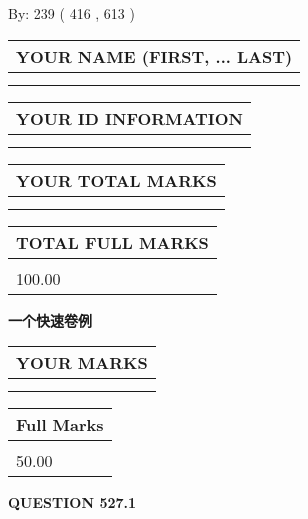 \documentclass{ctexart}
\begin{document}
   
\hspace{1.0in} By: 
 239 ( 416 ,  613 )
   
   
   
   
\newpage 
\setcounter{page}{ 
   527001 } 
   
   
   
   
\noindent\begin{tabular}{|l|}
\hline
YOUR NAME (FIRST, ... LAST)  \\
\hline
 \\ 
 \\ 
\hline
\end{tabular}
\hspace{0.05in} \begin{tabular}{|l|}
\hline
 YOUR   ID   INFORMATION  \\
\hline
 \\ 
 \\ 
\hline
\end{tabular}
   
   
\vspace{0.2in}\noindent\begin{tabular}{|l|}
\hline
YOUR TOTAL MARKS  \\
\hline
 \\ 
 \\ 
\hline
\end{tabular}
\hspace{0.05in} \begin{tabular}{|l|}
\hline
TOTAL FULL MARKS  \\
\hline
 \\ 
100.00 \\
\hline
\end{tabular}
   
   
 \vspace{0.2in}
{\LARGE {\textbf{ 一个快速卷例}}}
   
   
  
\vspace{0.2in}
  
\noindent\begin{tabular}{|l|}
\hline
 YOUR MARKS  \\
\hline
 \\ 
 \\ 
\hline
\end{tabular}
\hspace{0.05in} \begin{tabular}{|l|}
\hline
 Full Marks  \\
\hline
 \\ 
50.00 \\
\hline
\end{tabular}
{\textbf{\Large{QUESTION
527.1 
}}}
  
\end{document}
